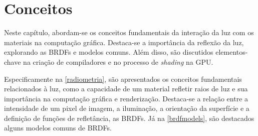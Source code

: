 \documentclass[english, 
               brazil, 
               bsc] %
               {dcomp-abntex2}
\begin{document}

%
%
%
%

\chapter{Conceitos} \label{conceitos}

Neste capítulo, abordam-se os conceitos fundamentais da interação da luz com os materiais na computação gráfica. Destaca-se a importância da reflexão da luz, explorando as BRDFs e modelos comuns. Além disso, são discutidos elementos-chave na criação de compiladores e no processo de \textit{shading} na GPU.

Especificamente na \autoref{radiometria}, são apresentados os conceitos fundamentais relacionados à luz, como a capacidade de um material refletir raios de luz e sua importância na computação gráfica e renderização. Destaca-se a relação entre a intensidade de um pixel de imagem, a iluminação, a orientação da superfície e a definição de funções de refletância, as BRDFs. Já na \autoref{brdfmodels}, são destacados alguns modelos comuns de BRDFs.
\end{document}
